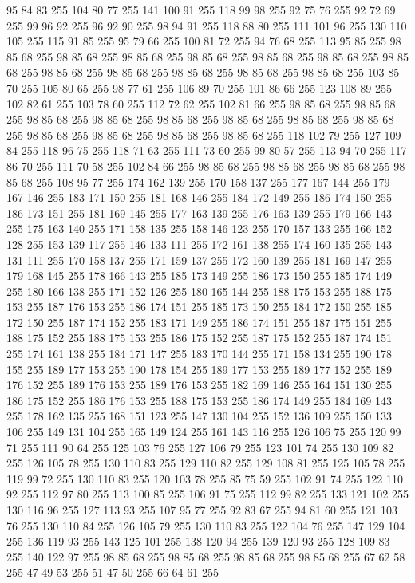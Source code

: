 95 84 83 255 104 80 77 255 141 100 91 255 118 99 98 255 92 75 76 255 92 72 69 255 99 96 92 255 96 92 90 255 98 94 91 255 118 88 80 255 111 101 96 255 130 110 105 255 115 91 85 255 95 79 66 255 100 81 72 255 94 76 68 255 113 95 85 255 98 85 68 255 98 85 68 255 98 85 68 255 98 85 68 255 98 85 68 255 98 85 68 255 98 85 68 255 98 85 68 255 98 85 68 255 98 85 68 255 98 85 68 255 98 85 68 255 103 85 70 255 105 80 65 255 98 77 61 255 106 89 70 255 101 86 66 255 123 108 89 255 102 82 61 255 103 78 60 255 112 72 62 255 102 81 66 255 98 85 68 255 98 85 68 255 98 85 68 255 98 85 68 255 98 85 68 255 98 85 68 255 98 85 68 255 98 85 68 255 98 85 68 255 98 85 68 255 98 85 68 255 98 85 68 255 118 102 79 255 127 109 84 255 118 96 75 255 118 71 63 255 111 73 60 255 99 80 57 255 113 94 70 255 117 86 70 255 111 70 58 255 102 84 66 255 98 85 68 255 98 85 68 255 98 85 68 255
98 85 68 255 108 95 77 255 174 162 139 255 170 158 137 255 177 167 144 255 179 167 146 255 183 171 150 255 181 168 146 255 184 172 149 255 186 174 150 255 186 173 151 255 181 169 145 255 177 163 139 255 176 163 139 255 179 166 143 255 175 163 140 255 171 158 135 255 158 146 123 255 170 157 133 255 166 152 128 255 153 139 117 255 146 133 111 255 172 161 138 255 174 160 135 255 143 131 111 255 170 158 137 255 171 159 137 255 172 160 139 255 181 169 147 255 179 168 145 255 178 166 143 255 185 173 149 255 186 173 150 255 185 174 149 255 180 166 138 255 171 152 126 255 180 165 144 255 188 175 153 255 188 175 153 255 187 176 153 255 186 174 151 255 185 173 150 255 184 172 150 255 185 172 150 255 187 174 152 255 183 171 149 255 186 174 151 255 187 175 151 255 188 175 152 255 188 175 153 255 186 175 152 255 187 175 152 255 187 174 151 255 174 161 138 255 184 171 147 255 183 170 144 255 171 158 134 255 190 178 155 255 189 177 153 255 190 178 154 255 189 177 153 255 189 177 152 255 189 176 152 255 189 176 153 255
189 176 153 255 182 169 146 255 164 151 130 255 186 175 152 255 186 176 153 255 188 175 153 255 186 174 149 255 184 169 143 255 178 162 135 255 168 151 123 255 147 130 104 255 152 136 109 255 150 133 106 255 149 131 104 255 165 149 124 255 161 143 116 255 126 106 75 255 120 99 71 255 111 90 64 255 125 103 76 255 127 106 79 255 123 101 74 255 130 109 82 255 126 105 78 255 130 110 83 255 129 110 82 255 129 108 81 255 125 105 78 255 119 99 72 255 130 110 83 255 120 103 78 255 85 75 59 255 102 91 74 255 122 110 92 255 112 97 80 255 113 100 85 255 106 91 75 255 112 99 82 255 133 121 102 255 130 116 96 255 127 113 93 255 107 95 77 255 92 83 67 255 94 81 60 255 121 103 76 255 130 110 84 255 126 105 79 255 130 110 83 255 122 104 76 255 147 129 104 255 136 119 93 255 143 125 101 255 138 120 94 255 139 120 93 255 128 109 83 255 140 122 97 255 98 85 68 255 98 85 68 255 98 85 68 255 98 85 68 255 67 62 58 255 47 49 53 255 51 47 50 255 66 64 61 255
